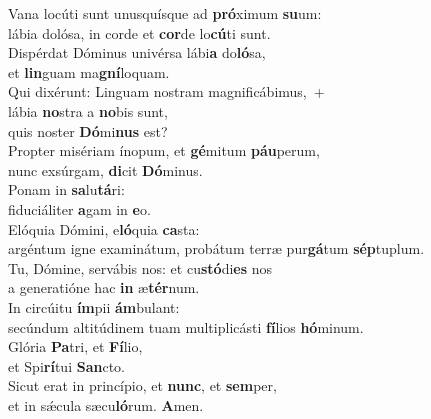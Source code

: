 \evenverse Vana locúti sunt unusquísque ad \textbf{pró}ximum \textbf{su}um:~\*\\
\evenverse lábia dolósa, in corde et \textbf{cor}de lo\textbf{cú}ti sunt.\\
\oddverse Dispérdat Dóminus univérsa lábi\textbf{a} do\textbf{ló}sa,~\*\\
\oddverse et \textbf{lin}guam ma\textbf{gní}loquam.\\
\evenverse Qui dixérunt: Linguam nostram magnificábimus,~+\\
\evenverse  lábia \textbf{no}stra a \textbf{no}bis sunt,~\*\\
\evenverse quis noster \textbf{Dó}mi\textbf{nus} est?\\
\oddverse Propter misériam ínopum, et \textbf{gé}mitum \textbf{páu}perum,~\*\\
\oddverse nunc exsúrgam, \textbf{di}cit \textbf{Dó}minus.\\
\evenverse Ponam in \textbf{sa}lu\textbf{tá}ri:~\*\\
\evenverse fiduciáliter \textbf{a}gam in \textbf{e}o.\\
\oddverse Elóquia Dómini, e\textbf{ló}quia \textbf{ca}sta:~\*\\
\oddverse argéntum igne examinátum, probátum terræ pur\textbf{gá}tum \textbf{sép}tuplum.\\
\evenverse Tu, Dómine, servábis nos: et cu\textbf{stó}di\textbf{es} nos~\*\\
\evenverse a generatióne hac \textbf{in} æ\textbf{tér}num.\\
\oddverse In circúitu \textbf{ím}pii \textbf{ám}bulant:~\*\\
\oddverse secúndum altitúdinem tuam multiplicásti \textbf{fí}lios \textbf{hó}minum.\\
\evenverse Glória \textbf{Pa}tri, et \textbf{Fí}lio,~\*\\
\evenverse et Spi\textbf{rí}tui \textbf{San}cto.\\
\oddverse Sicut erat in princípio, et \textbf{nunc}, et \textbf{sem}per,~\*\\
\oddverse et in sǽcula sæcu\textbf{ló}rum. \textbf{A}men.\\

